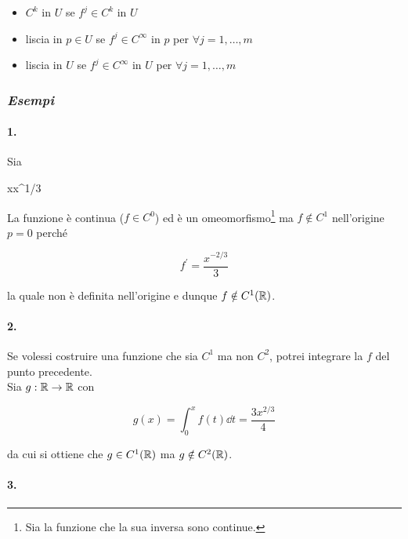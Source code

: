 \begin{itemize}
	\item $ C^{k} $ in $ U $ se $ f^{j} \in C^{k} $ in $ U $
	
	\item liscia in $ p \in U $ se $ f^{j} \in C^{\infty} $ in $ p $ per $ \forall j = 1, \dots, m $
	
	\item liscia in $ U $ se $ f^{j} \in C^{\infty} $ in $ U $ per $ \forall j = 1, \dots, m $
\end{itemize}

\subsubsection{\textit{Esempi}}

\paragraph{1.}

Sia

	{\R}{\R}
	{x}{x^{1/3}}
	
La funzione è continua ($ f \in C^{0} $) ed è un omeomorfismo\footnote{%
	Sia la funzione che la sua inversa sono continue.%
} ma $ f \notin C^{1} $ nell'origine $ p = 0 $ perché

\begin{equation}
	f^{\prime} = \dfrac{x^{-2/3}}{3}
\end{equation}

la quale non è definita nell'origine e dunque $ f \notin C^{1} (\mathbb{R}) $.

\paragraph{2.}

Se volessi costruire una funzione che sia $ C^{1} $ ma non $ C^{2} $, potrei integrare la $ f $ del punto precedente.\\
Sia $ g : \mathbb{R} \to \mathbb{R} $ con

\begin{equation}
	g (x) = \int_{0}^{x} f (t) \dd{t} = \dfrac{3 x^{2/3}}{4}
\end{equation}

da cui si ottiene che $ g \in C^{1} (\mathbb{R}) $ ma $ g \notin C^{2} (\mathbb{R}) $.

\paragraph{3.}

